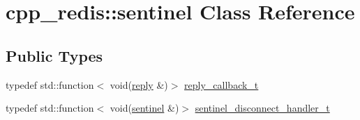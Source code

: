 \hypertarget{classcpp__redis_1_1sentinel}{}\section{cpp\+\_\+redis\+:\+:sentinel Class Reference}
\label{classcpp__redis_1_1sentinel}
\subsection*{Public Types}
\begin{DoxyCompactItemize}
\item 
typedef std\+::function$<$ void(\hyperlink{classcpp__redis_1_1reply}{reply} \&)$>$ \hyperlink{classcpp__redis_1_1sentinel_ae1a150ff8787208c47414397a061c9a7}{reply\+\_\+callback\+\_\+t}
\item 
typedef std\+::function$<$ void(\hyperlink{classcpp__redis_1_1sentinel}{sentinel} \&)$>$ \hyperlink{classcpp__redis_1_1sentinel_a923e06b5b700c16dffec8a01d2fa9aa4}{sentinel\+\_\+disconnect\+\_\+handler\+\_\+t}
\end{DoxyCompactItemize}
